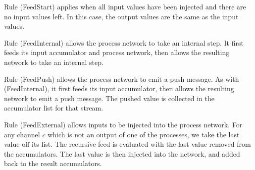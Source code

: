 
Rule (FeedStart) applies when all input values have been injected and there are no input values left.
In this case, the output values are the same as the input values.

Rule (FeedInternal) allows the process network to take an internal step.
It first feeds its input accumulator and process network, then allows the resulting network to take an internal step.

Rule (FeedPush) allows the process network to emit a push message.
As with (FeedInternal), it first feeds its input accumulator, then allows the resulting network to emit a push message.
The pushed value is collected in the accumulator list for that stream.

Rule (FeedExternal) allows inputs to be injected into the process network.
For any channel $c$ which is not an output of one of the processes, we take the last value off its list.
The recursive feed is evaluated with the last value removed from the accumulators.
The last value is then injected into the network, and added back to the result accumulators.








